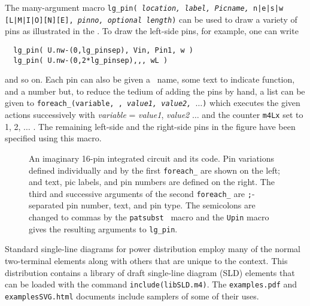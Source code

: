 The many-argument macro
 {\tt lg\_pin( {\sl location, label, Picname,} n|e|s|w [L|M|I|O][N][E],
  {\sl pinno, optional length})}
can be used to draw a variety of pins as illustrated in the .
To draw the left-side pins, for example, one can write
\begin{verbatim}
  lg_pin( U.nw-(0,lg_pinsep), Vin, Pin1, w )
  lg_pin( U.nw-(0,2*lg_pinsep),,, wL )
\end{verbatim}
\noindent
and so on.
Each pin can also be given a \pic\ name, some text
to indicate function, and a number but,
to reduce the tedium of adding the pins by hand, a list
can be given to
{\tt foreach\_(variable,
,
{\sl value1, value2, $\ldots$})}
which executes the given actions successively with
 {\sl variable} = {\sl value1}, {\sl value2} $\ldots$ and the
 counter {\tt m4Lx} set to 1, 2, $\ldots$ .  The remaining left-side
 and the right-side pins in the figure have been specified using this
 macro.
\begin{figure}[H]
   \parbox{\textwidth}{\small}%
   \hfill\llap{\raise-0.15in\hbox{ }}%
   \vspace*{-\baselineskip}%
   \caption{ An imaginary 16-pin integrated circuit and its code.
    Pin variations defined individually and by the first {\tt foreach\_}
    are shown on the left; and text, pic labels, and pin
    numbers are defined on the right.
    The third and successive arguments of the second
    {\tt foreach\_}
    are {\tt ;}-separated pin number, text, and pin type. The
    semicolons are changed to commas by the {\tt patsubst} \Mfour\ macro
    and the {\tt Upin} macro gives the resulting arguments to {\tt lg\_pin}.
\label{sampleIC}}%
   \end{figure}


 Standard single-line diagrams for power distribution employ many of
 the normal two-terminal elements along with others that are unique to
 the context.  This distribution contains a library of draft single-line
 diagram (SLD) elements that can be loaded with the
 command {\tt include(libSLD.m4)}.
 The {\tt examples.pdf} and {\tt examplesSVG.html}
 documents include samplers of some of their uses.

